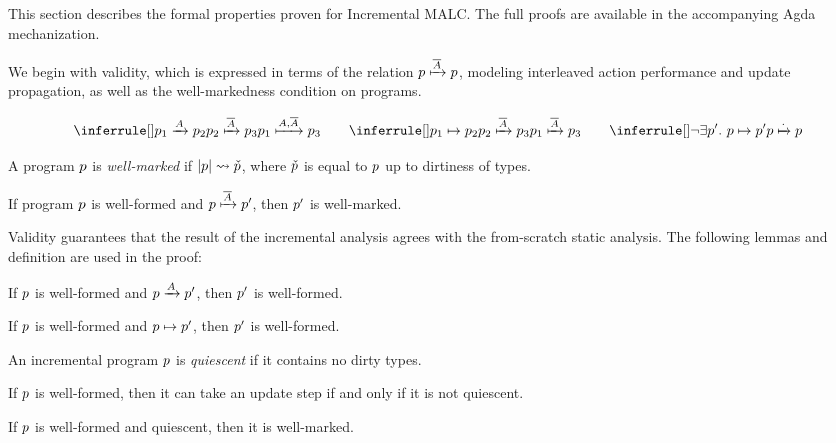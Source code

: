This section describes the formal properties proven for Incremental MALC. The full proofs are available in the accompanying Agda mechanization. 

We begin with validity, which is expressed in terms of the relation $p\xmapsto{\overline{\ensuremath{A}}}p$, modeling interleaved action performance and update propagation, as well as the well-markedness condition on programs. 

\[
\ActStepAct\hspace{20pt}
\ActStepStep\hspace{20pt}
\ActStepDone
\]


\begin{definition}
    A program $p$ is \textit{well-marked} if $|p|\leadsto\check{p}$, where $\check{p}$ is equal to $p$ up to dirtiness of types. 
\end{definition}

\begin{theorem}[Validity]
\label{theorem:Validity}
    If program $p$ is well-formed and $p\xmapsto{\overline{\ensuremath{A}}}p'$, then $p'$ is well-marked. 
\end{theorem}

Validity guarantees that the result of the incremental analysis agrees with the from-scratch static analysis. The following lemmas and definition are used in the proof:

\begin{lemma}
\label{lemma:Action Preservation}
    If $p$ is well-formed and $p\xrightarrow{A}p'$, then $p'$ is well-formed. 
\end{lemma}

\begin{lemma}
\label{lemma:Update Step Preservation}
    If $p$ is well-formed and $p\mapsto p'$, then $p'$ is well-formed. 
\end{lemma}

\begin{definition}[Quiescent]
    An incremental program $p$ is \textit{quiescent} if it contains no dirty types. 
\end{definition}

\begin{lemma}[Progress]
\label{lemma:Progress}
    If $p$ is well-formed, then it can take an update step if and only if it is not quiescent. 
\end{lemma}

\begin{lemma}
\label{lemma:Quiescent Validity}
    If $p$ is well-formed and quiescent, then it is well-marked.  
\end{lemma}

